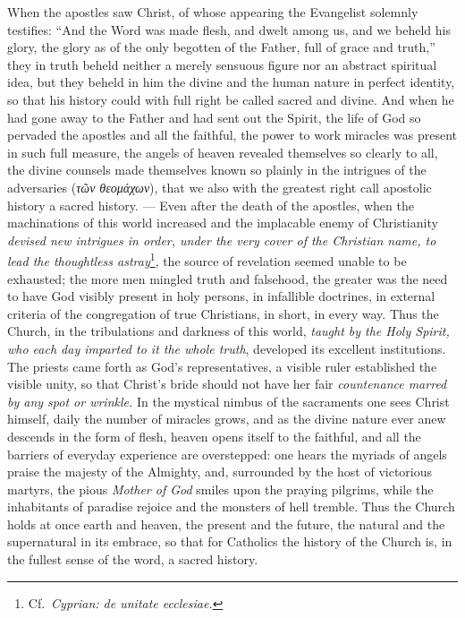 \documentclass[12pt]{book}
\newcommand{\opage}[1]{\marginnote{\footnotesize\textit{[#1]}}}
\begin{document}
When the apostles saw Christ, of whose appearing the Evangelist solemnly
testifies: ``And the Word was made flesh, and dwelt among us, and we beheld his
glory, the glory as of the only begotten of the Father, full of grace and
truth,'' they in truth beheld neither a merely sensuous figure nor an abstract
spiritual idea, but they beheld in him the divine and the human nature in
perfect identity, so that his history could with full right be called sacred
and divine. And when he had gone away to the Father and had sent out the
Spirit, the life of God so pervaded the apostles and all the faithful,
\opage{55} \setcounter{footnote}{0}%
the power to work miracles was present in such full measure, the angels of
heaven revealed themselves so clearly to all, the divine counsels made
themselves known so plainly in the intrigues of the adversaries (\textit{τῶν
θεομάχων}), that we also with the greatest right call apostolic history a
sacred history. --- Even after the death of the apostles, when the machinations
of this world increased and the implacable enemy of Christianity \emph{devised
new intrigues in order, under the very cover of the Christian name, to lead the
thoughtless astray}\footnote{Cf.\ \textit{Cyprian: de unitate ecclesiae.}}, the
source of revelation seemed unable to be exhausted; the more men mingled truth
and falsehood, the greater was the need to have God visibly present in holy
persons, in infallible doctrines, in external criteria of the congregation of
true Christians, in short, in every way. Thus the Church, in the tribulations
and darkness of this world, \emph{taught by the Holy Spirit, who each day
imparted to it the whole truth}, developed its excellent institutions. The
priests came forth as God's representatives, a visible ruler established the
visible unity, so that Christ's bride should not have her fair
\emph{countenance marred by any spot or wrinkle.} In the mystical nimbus of the
sacraments one sees Christ himself, daily the number of miracles grows, and as
the divine nature ever anew descends in the form of flesh, heaven opens itself
to the faithful, and all the barriers of everyday experience are overstepped:
one hears the myriads of angels praise the majesty of the Almighty, and,
surrounded by the host of victorious martyrs, the pious \emph{Mother of God}
smiles upon the praying pilgrims, while the inhabitants of paradise rejoice and
the monsters of hell tremble.
\opage{56} \setcounter{footnote}{0}%
Thus the Church holds at once earth and heaven, the present and the future, the
natural and the supernatural in its embrace, so that for Catholics the history
of the Church is, in the fullest sense of the word, a sacred history.
\end{document}
